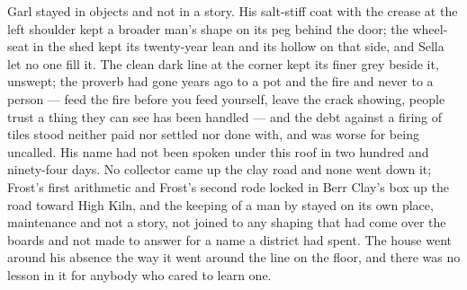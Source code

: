 Garl stayed in objects and not in a story. His salt-stiff coat with the crease at the left shoulder kept a broader man's shape on its peg behind the door; the wheel-seat in the shed kept its twenty-year lean and its hollow on that side, and Sella let no one fill it. The clean dark line at the corner kept its finer grey beside it, unswept; the proverb had gone years ago to a pot and the fire and never to a person --- feed the fire before you feed yourself, leave the crack showing, people trust a thing they can see has been handled --- and the debt against a firing of tiles stood neither paid nor settled nor done with, and was worse for being uncalled. His name had not been spoken under this roof in two hundred and ninety-four days. No collector came up the clay road and none went down it; Frost's first arithmetic and Frost's second rode locked in Berr Clay's box up the road toward High Kiln, and the keeping of a man by  stayed on its own place, maintenance and not a story, not joined to any shaping that had come over the boards and not made to answer for a name a district had spent. The house went around his absence the way it went around the line on the floor, and there was no lesson in it for anybody who cared to learn one.

\scenebreak

